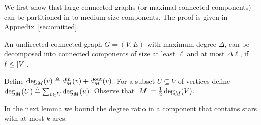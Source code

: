 We first show that large connected graphs (or maximal connected
components) can be partitioned in to medium size components.  The
proof is given in Appnedix~\ref{sec:omitted}.

\begin{lemma}
\label{lemma:dec}
An undirected connected graph $G = (V,E)$ with maximum degree
$\Delta$, can be decomposed into connected components of size at least
$\ell$ and at most $\Delta \ell$, if $\ell \leq \abs{V}$.
\end{lemma}

\iffalse %

\begin{proof}
Let $T$ be any spanning tree of $G$ and let $r$ be an arbitrary root.
Starting with $r$, repeatedly choose a child whose subtree is strictly
larger than $\frac{\Delta-1}{\Delta} \abs{V}$, until this is not
possible.  Hence, we have reached a vertex $v$ whose subtree contains
more than $\frac{\Delta-1}{\Delta} \abs{V}$ vertices, but the subtrees
of its children contain at most $\frac{\Delta-1}{\Delta} \abs{V}$
vertices.
%
If $v = r$, then $v$ has a child $u$ with at least $\inv{\Delta}
(\abs{V}-1) \geq \ell$ vertices.  Otherwise, there exists a child $u$
of $v$ whose subtree is of size at least
$\inv{\Delta} \abs{V} \geq \ell$.  Disconnect $u$ and the vertices in
its subtree from the graph.
%
In both cases $u$'s subtree contains at most
$\frac{\Delta-1}{\Delta} \abs{V}$ vertices, and thus at least
$\inv{\Delta} \abs{V} \geq \ell$ vertices remain in the graph.  Hence
we obtain two connected subgraphs of size at least $\ell$.
%
We repeat this procedure recursively on any component of size
strictly larger $\Delta\ell$.
\end{proof}

\fi %

Define $\deg_M(v) \eqdf \din[M](v) + \dout[M](v)$.  For a subset
$U \subseteq V$ of vertices define $\deg_M(U) \eqdf \sum_{v \in
U} \deg_M(u)$.
%
Observe that $\abs{M} = \half \deg_M(V)$.

In the next lemma we bound the degree ratio in a component that
contains stars with at most $k$ arcs.

